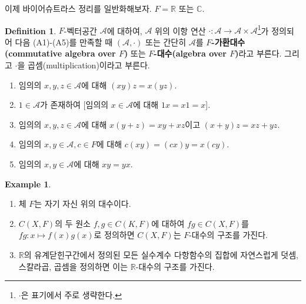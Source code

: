 \documentclass[11pt]{book}
\numberwithin{equation}{chapter}
\def\RR{\mathbb{R}}
\def\CC{\mathbb{C}}
\def\calA{\mathcal{A}}
\theoremstyle{definition}
\newtheorem{defn}[thm]{Definition}
\newtheorem*{ex}{Example}
\newenvironment{enum}
	{\begin{enumerate}[label=(\alph*), leftmargin=2\parindent]}
	{\end{enumerate}}
\begin{document}
이제 바이어슈트라스 정리를 일반화해보자. \(F = \RR\) 또는 \(\CC\).

\begin{defn}
    \(F\)-벡터공간 \(\calA\)에 대하여, \(\calA\) 위의 이항 연산 \(\cdot : \calA \to \calA \times \calA\)\footnote{\(\cdot\)은 표기에서 주로 생략한다.}가 정의되어 다음 (A1)-(A5)를 만족할 때 \((\calA, \cdot)\) 또는 간단히 \(\calA\)를 \textbf{\(F\)-가환대수(commutative algebra over \(F\))} 또는 \textbf{\(F\)-대수(algebra over \(F\))}라고 부른다. 그리고 \(\cdot\)을 곱셈(multiplication)이라고 부른다.
    \begin{enumerate}[label=(A\arabic*), leftmargin=2\parindent]
        \item 임의의 \(x, y, z \in \calA\)에 대해 \((xy)z = x(yz)\).
        \item \(1 \in \calA\)가 존재하여 [임의의 \(x \in \calA\)에 대해 \(1x = x1 = x\)].
        \item 임의의 \(x, y, z \in \calA\)에 대해 \(x(y+z) = xy+xz\)이고 \((x+y)z = xz + yz\).
        \item 임의의 \(x, y \in \calA, c \in F\)에 대해 \(c(xy) = (cx)y = x(cy)\).
        \item 임의의 \(x, y \in \calA\)에 대해 \(xy = yx\).
    \end{enumerate}
\end{defn}

\begin{ex}
    \quad

    \begin{enum}
        \item 체 \(F\)는 자기 자신 위의 대수이다.
        \item \(C(X, F)\)의 두 원소 \(f, g \in C(K, F)\)에 대하여 \(fg \in C(X, F)\)를 \(fg : x \mapsto f(x)g(x)\)로 정의하면 \(C(X, F)\)는 \(F\)-대수의 구조를 가진다.
        \item \(\RR\)의 유계닫힌구간에서 정의된 모든 실수계수 다항함수의 집합에 자연스럽게 덧셈, 스칼라곱, 곱셈을 정의하면 이는 \(\RR\)-대수의 구조를 가진다.
    \end{enum}
\end{ex}
\end{document}
